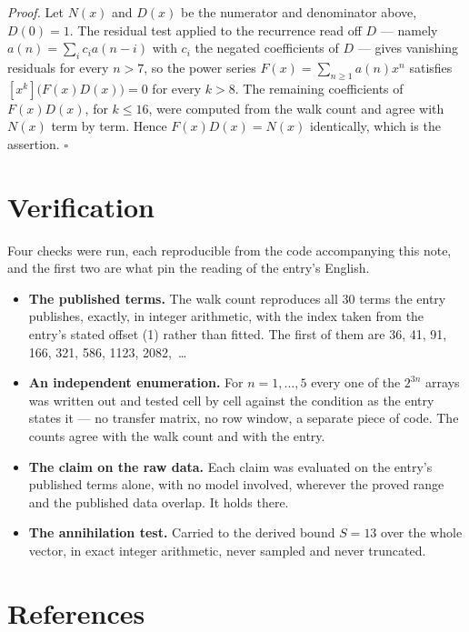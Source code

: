 \documentclass[11pt]{article}
\theoremstyle{definition}
\begin{document}
{\itshape Proof.} Let $N(x)$ and $D(x)$ be the numerator and denominator above, $D(0)=1$. The residual test applied to the recurrence read off $D$ --- namely $a(n) = \sum_i c_i a(n-i)$ with $c_i$ the negated coefficients of $D$ --- gives vanishing residuals for every $n > 7$, so the power series $F(x)=\sum_{n\ge 1}a(n)x^n$ satisfies $[x^k]\bigl(F(x)D(x)\bigr) = 0$ for every $k > 8$. The remaining coefficients of $F(x)D(x)$, for $k \le 16$, were computed from the walk count and agree with $N(x)$ term by term. Hence $F(x)D(x) = N(x)$ identically, which is the assertion. $\square$

\section{Verification}

Four checks were run, each reproducible from the code accompanying this note, and the first two are what pin the reading of the entry's English.

\begin{itemize}

\item {\bfseries The published terms.} The walk count reproduces all 30 terms the entry publishes, exactly, in integer arithmetic, with the index taken from the entry's stated offset (1) rather than fitted. The first of them are 36, 41, 91, 166, 321, 586, 1123, 2082,~\dots

\item {\bfseries An independent enumeration.} For $n = 1,\dots,5$ every one of the $2^{3n}$ arrays was written out and tested cell by cell against the condition as the entry states it --- no transfer matrix, no row window, a separate piece of code. The counts agree with the walk count and with the entry.

\item {\bfseries The claim on the raw data.} Each claim was evaluated on the entry's published terms alone, with no model involved, wherever the proved range and the published data overlap. It holds there.

\item {\bfseries The annihilation test.} Carried to the derived bound $S = 13$ over the whole vector, in exact integer arithmetic, never sampled and never truncated.

\end{itemize}

\section{References}
\end{document}
